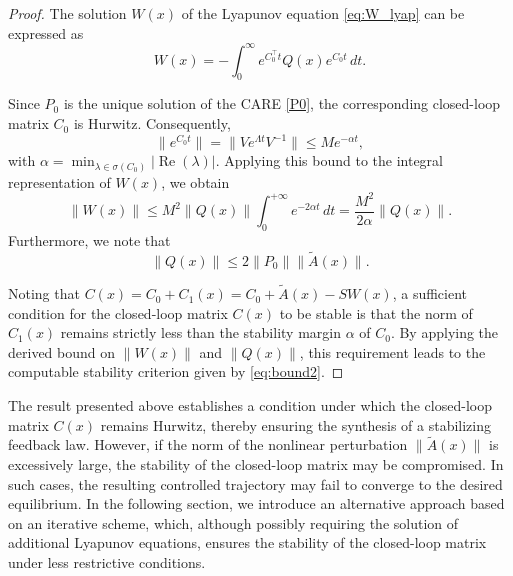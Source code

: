 \documentclass{article}
\begin{document}
\begin{proof}

The solution $W(x)$ of the Lyapunov equation \eqref{eq:W_lyap} can be expressed as
$$
W(x)=- \int_{0}^{\infty} e^{C_0^\top t} Q(x) e^{C_0 t}\,dt.
$$

Since $P_0$ is the unique solution of the CARE \eqref{P0}, the corresponding closed-loop matrix $C_0$ is Hurwitz. Consequently,
$$
\|e^{C_0 t}\| = \|V e^{\Lambda t } V^{-1}\| \le M e^{-\alpha t},
$$
with $\alpha = \min_{\lambda \in \sigma(C_0)} |\operatorname{Re}(\lambda)|$.
Applying this bound to the integral representation of $W(x)$, we obtain
$$
\|W(x)\| \le M^2 \| Q(x) \| \int_0^{+\infty}  e^{-2 \alpha t} \,dt = \frac{M^2}{2\alpha}  \| Q(x) \|. 
$$
Furthermore, we note that 
$$
\|Q(x) \| \le 2 \|P_0\| \|\tilde{A}(x)\|.
$$

Noting that $C(x) = C_0 + C_1(x) = C_0+ \tilde{A}(x)-S W(x)$,
a sufficient condition for the closed-loop matrix $C(x)$ to be stable is that the norm of $C_1(x)$ remains strictly less than the stability margin $\alpha$ of $C_0$. By applying the derived bound on $\|W(x)\|$ and $\|Q(x)\|$, this requirement leads to the computable stability criterion given by \eqref{eq:bound2}.
 
\end{proof}

The result presented above establishes a condition under which the closed-loop matrix $C(x)$ remains Hurwitz, thereby ensuring the synthesis of a stabilizing feedback law. However, if the norm of the nonlinear perturbation $\|\tilde{A}(x)\|$ is excessively large, the stability of the closed-loop matrix may be compromised. In such cases, the resulting controlled trajectory may fail to converge to the desired equilibrium. In the following section, we introduce an alternative approach based on an iterative scheme, which, although possibly requiring the solution of additional Lyapunov equations, ensures the stability of the closed-loop matrix under less restrictive conditions.
\end{document}
